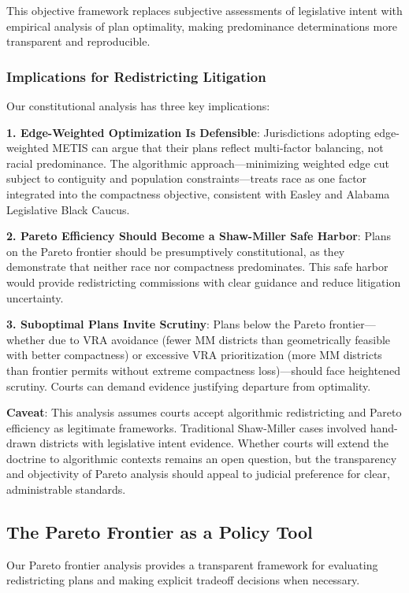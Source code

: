 This objective framework replaces subjective assessments of legislative intent with empirical analysis of plan optimality, making predominance determinations more transparent and reproducible.

\subsubsection{Implications for Redistricting Litigation}

Our constitutional analysis has three key implications:

\textbf{1. Edge-Weighted Optimization Is Defensible}: Jurisdictions adopting edge-weighted METIS can argue that their plans reflect multi-factor balancing, not racial predominance. The algorithmic approach---minimizing weighted edge cut subject to contiguity and population constraints---treats race as one factor integrated into the compactness objective, consistent with Easley and Alabama Legislative Black Caucus.

\textbf{2. Pareto Efficiency Should Become a Shaw-Miller Safe Harbor}: Plans on the Pareto frontier should be presumptively constitutional, as they demonstrate that neither race nor compactness predominates. This safe harbor would provide redistricting commissions with clear guidance and reduce litigation uncertainty.

\textbf{3. Suboptimal Plans Invite Scrutiny}: Plans below the Pareto frontier---whether due to VRA avoidance (fewer MM districts than geometrically feasible with better compactness) or excessive VRA prioritization (more MM districts than frontier permits without extreme compactness loss)---should face heightened scrutiny. Courts can demand evidence justifying departure from optimality.

\textbf{Caveat}: This analysis assumes courts accept algorithmic redistricting and Pareto efficiency as legitimate frameworks. Traditional Shaw-Miller cases involved hand-drawn districts with legislative intent evidence. Whether courts will extend the doctrine to algorithmic contexts remains an open question, but the transparency and objectivity of Pareto analysis should appeal to judicial preference for clear, administrable standards.

\subsection{The Pareto Frontier as a Policy Tool}

Our Pareto frontier analysis provides a transparent framework for evaluating redistricting plans and making explicit tradeoff decisions when necessary.

